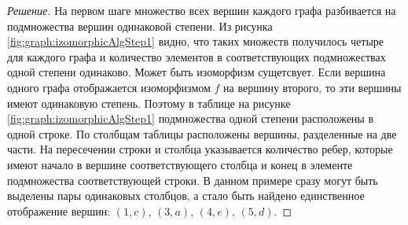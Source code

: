 \begin{proof}[Решение]
    На первом шаге множество всех вершин каждого графа разбивается на подмножества вершин одинаковой степени. Из рисунка \ref{fig:graph:izomorphicAlgStep1} видно, что таких множеств получилось четыре для каждого графа и количество элементов в соответствующих подмножествах одной степени одинаково. Может быть изоморфизм сущетсвует. Если вершина одного графа отображается изоморфизмом $f$ на вершину второго, то эти вершины имеют одинаковую степень. Поэтому в таблице на рисунке \ref{fig:graph:izomorphicAlgStep1} подмножества одной степени расположены в одной строке. По столбщам таблицы расположены вершины, разделенные на две части. На пересечении строки и столбца указывается количество ребер, которые имеют начало в вершине соответствующего столбца и конец в элементе подмножества соответствующей строки. В данном примере сразу могут быть выделены пары одинаковых столбцов, а стало быть найдено единственное отображение вершин: $(1,c)$, $(3,a)$, $(4,e)$, $(5,d)$.
    

\end{proof}

